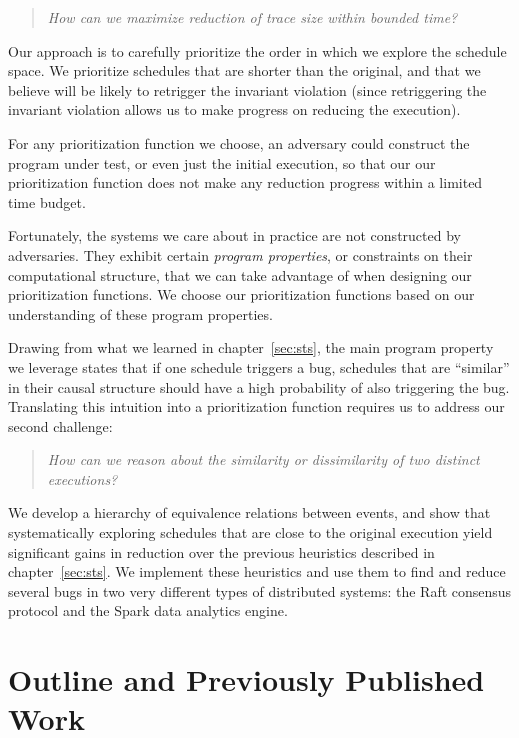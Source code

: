 \begin{quote}
\textit{How can we maximize reduction of trace size within bounded time?}
\end{quote}

Our approach is to carefully prioritize the order in which we explore
the schedule space. We prioritize schedules that are shorter than the
original, and that we believe will be likely to
retrigger the invariant violation (since retriggering the invariant violation allows us to make
progress on reducing the execution).

For any prioritization function we choose, an adversary could construct
the program under test, or even just the initial execution, so that our our prioritization
function does not make any reduction progress within a limited time budget.

Fortunately, the systems we care about in practice are not constructed by
adversaries. They exhibit certain \textit{program properties}, or constraints
on their computational structure,
that we can take advantage of when designing our prioritization functions.
We choose our
prioritization functions based on our understanding of these program
properties.

Drawing from what we learned in
chapter~\ref{sec:sts}, the main program property we leverage states that if one schedule triggers a bug,
schedules that are ``similar'' in their causal structure should have a high probability of also triggering the bug.
Translating this intuition into a prioritization function requires us to address our second challenge:

\begin{quote}
\textit{How can we reason about the similarity or dissimilarity of two distinct executions?}
\end{quote}

We develop a hierarchy of equivalence relations between events, and show
that systematically exploring schedules that are close to the original
execution yield significant gains in reduction over the previous
heuristics described in chapter~\ref{sec:sts}. We implement these heuristics
and use them to find and reduce several bugs in two very different types of distributed
systems: the Raft consensus protocol
and the Spark data analytics engine.

\section{Outline and Previously Published Work}

